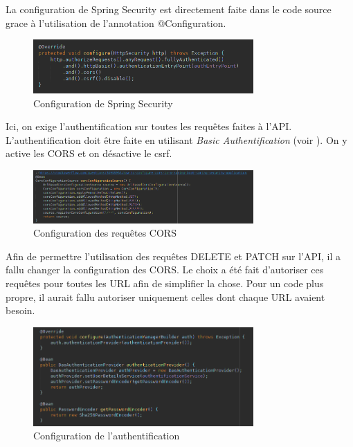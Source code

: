 			La configuration de Spring Security est directement faite dans le code source grace à l'utilisation de l'annotation @Configuration.

			\begin{figure}[H]
				\centering\includegraphics[width=0.75\textwidth, keepaspectratio]{res/config-httpsecurity.png}
				\caption{Configuration de Spring Security}
			\end{figure}

			Ici, on exige l'authentification sur toutes les requêtes faites à l'API. L'authentification doit être faite en utilisant \textit{Basic Authentification} (voir ). On y active les CORS et on désactive le csrf.

			\begin{figure}[H]
				\centering\includegraphics[width=0.75\textwidth, keepaspectratio]{res/config-cors.png}
				\caption{Configuration des requêtes CORS}
			\end{figure}

			Afin de permettre l'utilisation des requêtes DELETE et PATCH sur l'API, il a fallu changer la configuration des CORS. Le choix a été fait d'autoriser ces requêtes pour toutes les URL afin de simplifier la chose. Pour un code plus propre, il aurait fallu autoriser uniquement celles dont chaque URL avaient besoin.

			\begin{figure}[H]
				\centering\includegraphics[width=0.75\textwidth, keepaspectratio]{res/config-authentification.png}
				\caption{Configuration de l'authentification}
			\end{figure}

